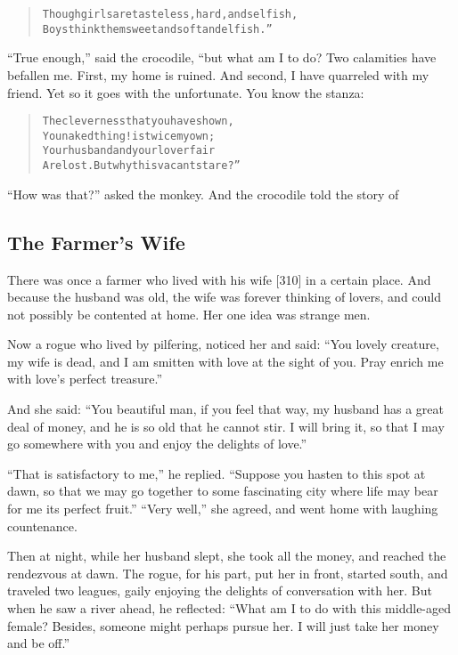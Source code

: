 \documentclass[article, twoside, 14pt]{memoir}
\renewenvironment{verbatim}{%
\begin{quote}%
\vskip -10pt%
\begin{alltt}\normalfont\large}{\end{alltt}%
\end{quote}%
\vskip -10pt
} %
\begin{document}
\begin{verbatim}
Though girls are tasteless, hard, and selfish,
Boys think them sweet and soft and elfish.”
\end{verbatim}
``True enough,'' said the crocodile, “but what am I to do? Two
calamities have befallen me. First, my home is ruined. And second,
I have quarreled with my friend. Yet so it goes with the
unfortunate. You know the stanza:

\begin{verbatim}
The cleverness that you have shown,
You naked thing! is twice my own;
Your husband and your lover fair
Are lost. But why this vacant stare?”
\end{verbatim}
``How was that?'' asked the monkey. And the crocodile told the
story of

\subsection{The Farmer's Wife}

\label{s74}

There was once a farmer who lived with his wife [310] in a certain
place. And because the husband was old, the wife was forever
thinking of lovers, and could not possibly be contented at home.
Her one idea was strange men.

Now a rogue who lived by pilfering, noticed her and said:
``You lovely creature, my wife is dead, and I am smitten with love at the sight of you. Pray enrich me with love's perfect treasure.''

And she said:
``You beautiful man, if you feel that way, my husband has a great deal of money, and he is so old that he cannot stir. I will bring it, so that I may go somewhere with you and enjoy the delights of love.''

``That is satisfactory to me,'' he replied.
``Suppose you hasten to this spot at dawn, so that we may go together to some fascinating city where life may bear for me its perfect fruit.''
``Very well,'' she agreed, and went home with laughing
countenance.

Then at night, while her husband slept, she took all the money, and
reached the rendezvous at dawn. The rogue, for his part, put her in
front, started south, and traveled two leagues, gaily enjoying the
delights of conversation with her. But when he saw a river ahead,
he reflected:
``What am I to do with this middle-aged female? Besides, someone might perhaps pursue her. I will just take her money and be off.''
\end{document}
